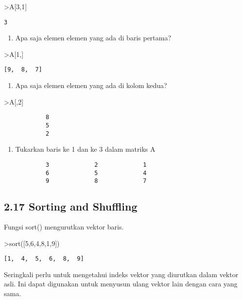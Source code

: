 \documentclass[
]{book}
\providecommand{\tightlist}{%
  \setlength{\itemsep}{0pt}\setlength{\parskip}{0pt}}
\begin{document}
\textgreater A{[}3,1{]}

\begin{verbatim}
3
\end{verbatim}

\begin{enumerate}
\def\labelenumi{\arabic{enumi}.}
\setcounter{enumi}{1}
\tightlist
\item
  Apa saja elemen elemen yang ada di baris pertama?
\end{enumerate}

\textgreater A{[}1,{]}

\begin{verbatim}
[9,  8,  7]
\end{verbatim}

\begin{enumerate}
\def\labelenumi{\arabic{enumi}.}
\setcounter{enumi}{2}
\tightlist
\item
  Apa saja elemen elemen yang ada di kolom kedua?
\end{enumerate}

\textgreater A{[},2{]}

\begin{verbatim}
            8 
            5 
            2 
\end{verbatim}

\begin{enumerate}
\def\labelenumi{\arabic{enumi}.}
\setcounter{enumi}{3}
\tightlist
\item
  Tukarkan baris ke 1 dan ke 3 dalam matriks A
\end{enumerate}

\begin{verbatim}
            3             2             1 
            6             5             4 
            9             8             7 
\end{verbatim}

\subsection{2.17 Sorting and Shuffling}\label{sorting-and-shuffling}

Fungsi sort() mengurutkan vektor baris.

\textgreater sort({[}5,6,4,8,1,9{]})

\begin{verbatim}
[1,  4,  5,  6,  8,  9]
\end{verbatim}

Seringkali perlu untuk mengetahui indeks vektor yang diurutkan dalam vektor asli. Ini dapat digunakan untuk menyusun ulang vektor lain dengan cara yang sama.
\end{document}
